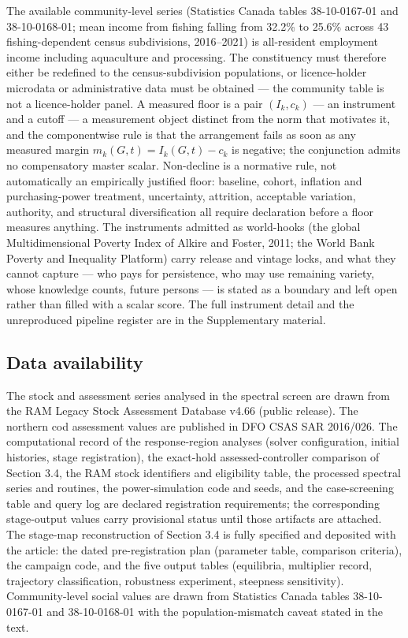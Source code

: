 \documentclass[11pt]{article}
\begin{document}
The available community-level series (Statistics Canada tables
38-10-0167-01 and 38-10-0168-01; mean income from fishing falling from
32.2\% to 25.6\% across 43 fishing-dependent census subdivisions,
2016--2021) is all-resident employment income including aquaculture and
processing. The constituency must therefore either be redefined to the
census-subdivision populations, or licence-holder microdata or
administrative data must be obtained --- the community table is not a
licence-holder panel. A measured floor is a pair \((I_k,c_k)\) --- an
instrument and a cutoff --- a measurement object distinct from the norm
that motivates it, and the componentwise rule is that the arrangement
fails as soon as any measured margin \(m_k(G,t)=I_k(G,t)-c_k\) is
negative; the conjunction admits no compensatory master scalar.
Non-decline is a normative rule, not automatically an empirically
justified floor: baseline, cohort, inflation and purchasing-power
treatment, uncertainty, attrition, acceptable variation, authority, and
structural diversification all require declaration before a floor
measures anything. The instruments admitted as world-hooks (the global
Multidimensional Poverty Index of Alkire and Foster, 2011; the World
Bank Poverty and Inequality Platform) carry release and vintage locks,
and what they cannot capture --- who pays for persistence, who may use
remaining variety, whose knowledge counts, future persons --- is stated
as a boundary and left open rather than filled with a scalar score. The
full instrument detail and the unreproduced pipeline register are in the
Supplementary material.

\subsection{Data availability}\label{data-availability}

The stock and assessment series analysed in the spectral screen are
drawn from the RAM Legacy Stock Assessment Database v4.66 (public
release). The northern cod assessment values are published in DFO CSAS
SAR 2016/026. The computational record of the response-region analyses
(solver configuration, initial histories, stage registration), the
exact-hold assessed-controller comparison of Section 3.4, the RAM stock
identifiers and eligibility table, the processed spectral series and
routines, the power-simulation code and seeds, and the case-screening
table and query log are declared registration requirements; the
corresponding stage-output values carry provisional status until those
artifacts are attached. The stage-map reconstruction of Section 3.4 is
fully specified and deposited with the article: the dated
pre-registration plan (parameter table, comparison criteria), the
campaign code, and the five output tables (equilibria, multiplier
record, trajectory classification, robustness experiment, steepness
sensitivity). Community-level social values are drawn from Statistics
Canada tables 38-10-0167-01 and 38-10-0168-01 with the
population-mismatch caveat stated in the text.
\end{document}
